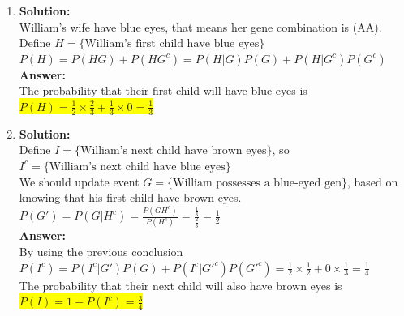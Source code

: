 \documentclass{article}
\newcommand{\myansw}{\textbf{Answer:}\\}
\newcommand{\mysolu}{\textbf{Solution:}\\}
\begin{document}
\begin{enumerate}
\begin{enumerate}
		\mysolu
		Assume A is the blue-eyed genes and B is the brown-eyed gene. Since William's sister have blue eye and William and both of his parents have brown eyes, we can know that both of William's parents are (AB) combination.
		The possible gene combinations of William is (AA), (AB), (BA), (BB). Define ${E = \{\text{William possesses a blue-eyed gene}\}}$, ${F = \{\text{William has brown eyes}\}}$.\\
		${P(F) = \frac{3}{4}}$\\
		${P(E)= \frac{2}{4} = \frac{1}{2}}$\\
		\myansw
		The probability that William possesses a blue-eyed gene is\\
		\colorbox{yellow}{${P(G)=P(E|F)=\frac{P(EF)}{P(F)}=\frac{0.5}{0.75}=\frac{2}{3}}$}\\
		\item
		\mysolu
		William's wife have blue eyes, that means her gene combination is (AA).\\
		Define ${H = \{\text{William's first child have blue eyes}\}}$\\
		${P(H) = P(HG)+P(HG^c)={P(H|G)}{P(G)}+{P(H|G^c)}{P(G^c)}}$\\
		\myansw
		The probability that their first child will have blue eyes is\\
		\colorbox{yellow}{${P(H) = \frac{1}{2} \times \frac{2}{3}+\frac{1}{3} \times 0 = \frac{1}{3}}$}\\
		\item
		\mysolu
		Define ${I = \{\text{William's next child have brown eyes}\}}$, so ${I^c = \{\text{William's next child have blue eyes}\}}$\\
		We should update event ${G = \{\text{William possesses a blue-eyed gen}\}}$, based on knowing that his first child have brown eyes.\\
		${P(G')=P(G|H^c)=\frac{P(GH^c)}{P(H^c)}=\frac{\frac{1}{3}}{\frac{2}{3}}=\frac{1}{2}}$\\
		\myansw
		By using the previous conclusion\\
		${P(I^c)= P(I^c|G')P(G)+P(I^c|G'^c)P(G'^c)=\frac{1}{2}\times \frac{1}{2}+0 \times \frac{1}{3} = \frac{1}{4}}$\\
		The probability that their next child will also have brown eyes is\\
		\colorbox{yellow}{${P(I)=1-P(I^c) = \frac{3}{4}}$} \\
		

\end{enumerate}
\end{enumerate}
\end{document}
